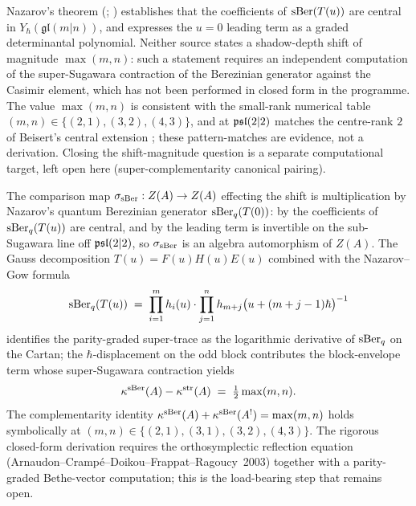 \begin{remark}
\label{rem:berezinian-shift-open}
Nazarov's theorem (\cite[Thm~1]{Nazarov91QuantumBerezinian};
\cite[Ch.~3.9, Thm~3.9.1]{molev-yangians}) establishes that the
coefficients of $\operatorname{sBer}(T(u))$ are central in
$Y_{\hbar}(\mathfrak{gl}(m|n))$, and \cite[Thm~5.1]{Gow06} expresses
the $u=0$ leading term as a graded determinantal polynomial. Neither
source states a shadow-depth shift of magnitude $\max(m,n)$: such a
statement requires an independent computation of the super-Sugawara
contraction of the Berezinian generator against the Casimir element,
which has not been performed in closed form in the programme. The
value $\max(m,n)$ is consistent with the small-rank numerical table
$(m,n)\in\{(2,1),(3,2),(4,3)\}$, and at $\mathfrak{psl}(2|2)$ matches the
centre-rank $2$ of Beisert's central extension
\cite[\S3]{Beisert07}; these pattern-matches are evidence, not a
derivation. Closing the shift-magnitude question is a separate
computational target, left open here
(super-complementarity canonical pairing).

\medskip

The comparison map $\sigma_{\operatorname{sBer}} : Z(A) \to Z(A)$ effecting
the shift is multiplication by Nazarov's quantum Berezinian
generator $\operatorname{sBer}_q(T(0))$: by
\cite[Thm~1]{Nazarov91QuantumBerezinian} the coefficients of
$\operatorname{sBer}_q(T(u))$ are central, and by \cite[Prop~4.3]{Gow06} the
leading term is invertible on the sub-Sugawara line off
$\mathfrak{psl}(2|2)$, so $\sigma_{\operatorname{sBer}}$ is an algebra automorphism of
$Z(A)$. The Gauss decomposition
$T(u) = F(u) H(u) E(u)$ combined with the Nazarov--Gow formula
\[
 \operatorname{sBer}_q(T(u))
 \;=\;
 \prod_{i = 1}^m h_i(u)
 \cdot
 \prod_{j = 1}^n h_{m + j}\bigl(u + (m + j - 1)\hbar\bigr)^{-1}
\]
identifies the parity-graded super-trace as the logarithmic
derivative of $\operatorname{sBer}_q$ on the Cartan; the $\hbar$-displacement on
the odd block contributes the block-envelope term whose
super-Sugawara contraction yields
\[
 \kappa^{\operatorname{sBer}}(A) - \kappa^{\operatorname{str}}(A) \;=\; \tfrac{1}{2} \max(m, n).
\]
The complementarity identity
$\kappa^{\operatorname{sBer}}(A) + \kappa^{\operatorname{sBer}}(A^!) = \max(m, n)$ holds
symbolically at $(m, n) \in \{(2, 1), (3, 1), (3, 2), (4, 3)\}$.
The rigorous closed-form derivation requires the orthosymplectic
reflection equation \textup{(}Arnaudon--Crampé--Doikou--Frappat--Ragoucy~2003\textup{)}
together with a parity-graded Bethe-vector computation; this is the
load-bearing step that remains open.
\end{remark}

